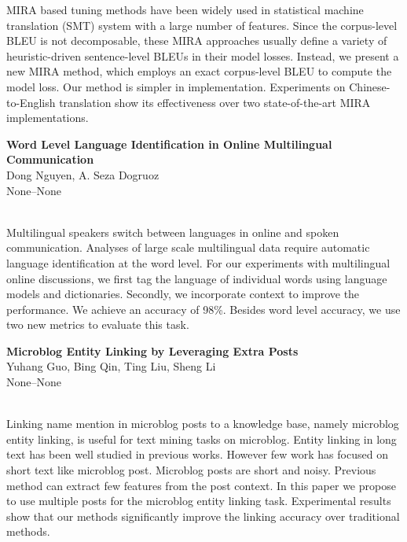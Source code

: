 \documentclass[twoside,makeidx]{book}
\renewcommand{\normalsize}{\fontsize{8}{9}\selectfont}
\renewcommand{\small}{\fontsize{7}{8}\selectfont}
\begin{document}
\nopagebreak%
\noindent%
{\small MIRA based tuning methods have been widely used in statistical machine translation (SMT) system with a large number of features. Since the corpus-level BLEU is not decomposable, these MIRA approaches usually define a variety of heuristic-driven sentence-level BLEUs in their model losses. Instead, we present a new MIRA method, which employs an exact corpus-level BLEU to compute the model loss. Our method is simpler in implementation. Experiments on Chinese-to-English translation show its effectiveness over two state-of-the-art MIRA implementations.}
\par\vspace{2em}\noindent%
\begin{minipage}{\linewidth}%
\begin{center}
\textbf{\normalsize Word Level Language Identification in Online Multilingual Communication}\\
\normalsize  Dong Nguyen,  A. Seza Dogruoz\\
{\small None--None}\\
\end{center}
\end{minipage}\\[0.5em]
\nopagebreak%
\noindent%
{\small Multilingual speakers switch between languages in online and spoken communication. Analyses of large scale multilingual data require automatic language identification at the word level. For our experiments with multilingual online discussions, we first tag the language of individual words using language models and dictionaries. Secondly, we incorporate context to improve the performance. We achieve an accuracy of 98\%.  Besides word level accuracy, we use two new metrics to evaluate this task.}
\par\vspace{2em}\noindent%
\begin{minipage}{\linewidth}%
\begin{center}
\textbf{\normalsize Microblog Entity Linking by Leveraging Extra Posts}\\
\normalsize  Yuhang Guo,  Bing Qin,  Ting Liu,  Sheng Li\\
{\small None--None}\\
\end{center}
\end{minipage}\\[0.5em]
\nopagebreak%
\noindent%
{\small Linking name mention in microblog posts to a knowledge base, namely microblog entity linking, is useful for text mining tasks on microblog.  Entity linking in long text has been well studied in previous works. However few work has focused on short text like microblog post.  Microblog posts are short and noisy. Previous method can extract few features from the post context.                       In this paper we propose to use multiple posts for the microblog entity linking task.  Experimental results show that our methods significantly improve the linking accuracy over traditional methods.}
\end{document}
